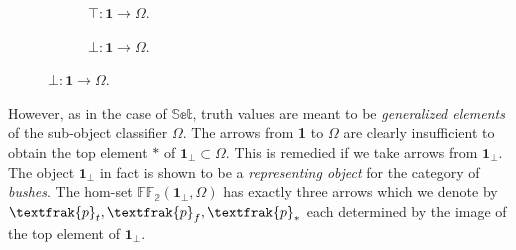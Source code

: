 \begin{figure}[h]
	\centering
	\begin{subfigure}[h]{0.2\textwidth}
		\caption{$\top : \mathbf{1} \rightarrow \Omega$.}
	\end{subfigure}
	\hfil
	\centering
	\begin{subfigure}[h]{0.2\textwidth}
		\caption{$\bot : \mathbf{1} \rightarrow \Omega$.}
	\end{subfigure}
\end{figure} 


However, as in the case of $\mathbb{Set}$, truth values are meant to be \emph{generalized elements} of the sub-object classifier $\Omega$. The arrows from \textbf{1} to $\Omega$ are clearly insufficient to obtain the top element $*$ of $\textbf{1}_\bot \subset \Omega$. This is remedied if we take arrows from $\textbf{1}_\bot$. 
The object $\textbf{1}_\bot$ in fact is shown to be a \emph{representing object} for the category of \emph{bushes}.
\newline \newline
The hom-set $\mathbb{FF_2}(\textbf{1}_\bot,\Omega)$ has exactly three arrows which we denote by $\textfrak{p}_t, \textfrak{p}_f, \textfrak{p}_*$ each determined by the image of the top element of $\textbf{1}_\bot$.     


